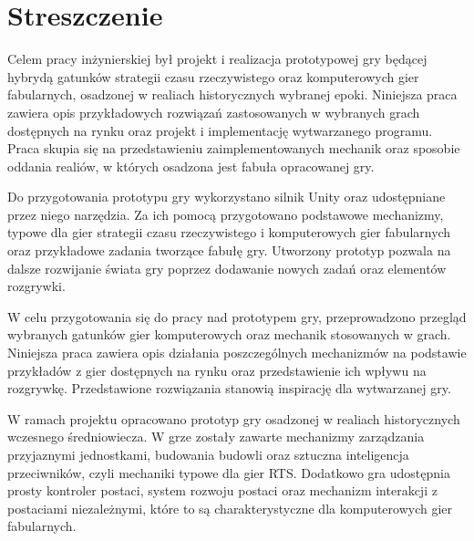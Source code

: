 \chapter*{Streszczenie}
Celem pracy inżynierskiej był projekt i realizacja prototypowej gry będącej hybrydą gatunków strategii czasu rzeczywistego oraz
komputerowych gier fabularnych, osadzonej w realiach historycznych
wybranej epoki. Niniejsza praca zawiera opis przykładowych rozwiązań zastosowanych w wybranych grach dostępnych na rynku
oraz projekt i implementację wytwarzanego programu. Praca skupia się na przedstawieniu zaimplementowanych mechanik oraz
sposobie oddania realiów, w których osadzona jest fabuła opracowanej gry.

Do przygotowania prototypu gry wykorzystano silnik Unity oraz udostępniane przez niego narzędzia. Za ich pomocą
przygotowano podstawowe mechanizmy, typowe dla gier strategii czasu rzeczywistego i komputerowych gier fabularnych oraz przykładowe zadania tworzące
fabułę gry. Utworzony prototyp pozwala na dalsze rozwijanie świata gry poprzez dodawanie nowych zadań oraz elementów
rozgrywki.

W celu przygotowania się do pracy nad prototypem gry, przeprowadzono przegląd wybranych gatunków gier komputerowych oraz
mechanik stosowanych w grach. Niniejsza praca zawiera opis działania poszczególnych mechanizmów na podstawie przykładów
z gier dostępnych na rynku oraz przedstawienie ich wpływu na rozgrywkę. Przedstawione rozwiązania stanowią inspirację dla wytwarzanej gry.

W ramach projektu opracowano prototyp gry osadzonej w realiach historycznych wczesnego średniowiecza. W grze zostały
zawarte mechanizmy zarządzania przyjaznymi jednostkami, budowania budowli oraz sztuczna inteligencja przeciwników, czyli
mechaniki typowe dla gier RTS. Dodatkowo gra udostępnia prosty kontroler postaci, system rozwoju postaci oraz mechanizm
interakcji z postaciami niezależnymi, które to są charakterystyczne dla komputerowych gier fabularnych.

